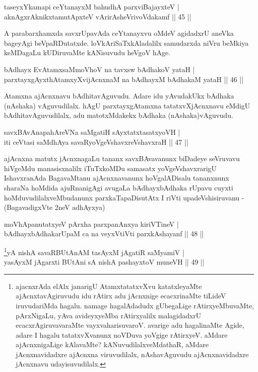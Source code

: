 \begin{shl}
taseyxYkamapi ceYtanayxM bahudhA parxviBajayxteV |\\
aknAgxrAknikxtamutApxteV vArirAsheVrivoVdakamf \hfill || 45 ||
\end{shl}

\begin{artha}
A parabarxhamxda savxrUpavAda ceYtanayxvu oMdeV agidadxrU aneVka bageyAgi beVpaRDutatxde. loVkAriSaTxkAladalilx samudarxda niVru beMkiya keMDagaLu kUDiruvaMte kANisuvudu heVgoV hAge.
\end{artha}


\begin{shl}
bAdhayx EvA\s \s tamxsaMmoVhoV na tavxsw bAdhakoV yataH |\\
parxtayxgAyxthAtamxyXvijAcnxnaM na bAdhayxM bAdhakaM yataH \hfill || 46 ||
\end{shl}

\begin{artha}
Atamxna ajAcnxnavu bAdhitavAguvudu. Adare idu yAvudakUkx bAdhaka (nAshaka) vAguvudilalx. hAgU parxtayxgAtamxna tatatxvXjAcnxnavu eMdigU bAdhitavAguvudilalx, adu matotxMdakekx bAdhaka (nAshaka)vAguvudu.
\end{artha}

\begin{shl}
savxBAvAnapahAreVNa saMgatiH sAyxtatxtasatxyoVH |\\
iti ceVtasi saMdhAya savaRyoVgeVshavxreVshavxraH \hfill || 47 ||
\end{shl}

\begin{artha}
ajAcnxna matutx jAcnxnagaLu tananx savxBAvavanunx biDadeye seVruvavu hiVgeMdu manasisxnalilx iTuTxkoMDu samasatx yoVgeVshavxrarigU IshavxranAda BagavaMtanu ajAcnxnavanunx hoVgalADisalu tananxnunx sharaNa hoMdida ajuRnanigAgi avugaLa bAdhayxbAdhaka rUpavu cuyxti hoMduvudilalxveMbudanunx parxkaTapaDisutAtx I riVti upadeVshisiruvanu -(BagavadigxVte 2neV adhAyxya)
\end{artha}

	
\begin{shl}
moVhApanutatxyeV pArxha parxpanAnxya kiriVTineV |\\
bAdhayxbAdhakarUpaM ca na veyxVtiVti parxkAshayanf \hfill || 48 ||
\end{shl}

\begin{shl}
\footnote{ajacnxrAda elAlx janarigU AtamxtatatxvXvu katatxleyaMte ajAcnxtavAgiruvudu idu rAtirx adu jAcnxnige ecacxrinaMte tiLideV iruvudariMda hagalu. namage hagalAdadudx gUbegaLige rAtirxyeMbuvaMte, pArxNigaLu, yAva avideyxyeMba rAtirxyalilx malagidadxrU ecacxrAgiruvavaraMte vayxvaharisuvaroV. avarige adu hagalinaMte Agide, adare I hagalu tatatxvXvanunx noVDuva yoVgige rAtirxyeV. aMdare ajAcnxnigaLige kAlavaMte? kANuvudilalxveMdathaR, aMdare jAcnxnavidadxre ajAcnxna viruvudilalx, nAshavAguvudu ajAcnxnavidadxre jAcnxnavu udayisuvudilalx.}yA nishA savaRBUtAnAM tasAyxM jAgatiR saMyamiV |\\
yasAyxM jAgarxti BUtAni sA nishA pashayxtoV muneVH \hfill || 49 ||
\end{shl}

